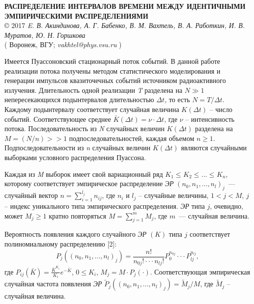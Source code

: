 \begin{center}{ \bf  РАСПРЕДЕЛЕНИЕ ИНТЕРВАЛОВ ВРЕМЕНИ МЕЖДУ ИДЕНТИЧНЫМИ ЭМПИРИЧЕСКИМИ РАСПРЕДЕЛЕНИЯМИ}\\
{\copyright} 2017 {\it  E. В. Акиндинова, А. Г. Бабенко, В. М. Вахтель,
В. А. Работкин,  И. В. Муратов, Ю. Н. Горшкова} \\
( Воронеж, ВГУ; {\it vakhtel@phys.vsu.ru} )
\end{center}

Имеется Пуассоновский стационарный поток событий.
В данной работе реализации потока получены методом статистического моделирования и генерации импульсов квазиточечных событий
источником радиоактивного излучения.
Длительность одной реализации \textit{T} разделена на $N \gg 1$ непересекающихся подынтервалов длительностью $\Delta t$\textit{,} то есть $N=T/\Delta t$. Каждому подынтервалу соответствует случайная величина $K(\Delta t)$ -- число событий.  Соответствующее среднее $\bar{K}(\Delta t)=\nu \cdot \Delta t$, где $\nu $ -- интенсивность потока. Последовательность из \textit{N} случайных величин $K(\Delta t)$ разделена на $M=(N/n)>>1$  подпоследовательностей, каждая объемом $n\ge 1$. Подпоследовательности из \textit{n}  случайных величин $K(\Delta t)$ являются случайными выборками условного распределения Пуассона.


Каждая из \textit{M} выборок имеет свой вариационный ряд $K_{1}  \le _{} K_{2}  \le _{}  ...  \le _{} K{}_{n} $,
которому соответствует эмпирическое распределение {\it ЭР} $ ( n_{0} ,    n_{1} ,  ...  ,   n_{l}  )_{j} $~---
случайный вектор $n=\sum _{i=1}^{l_{j} }n_{ij}  $, где $n_{i} $ и $l_{j} $ --  случайные величины,
$1<j<M$, $j$ -- индекс уникального типа эмпирического распределения.
{\it ЭР}  типа  $j$, очевидно, может $M_{j} \ge 1$ кратно повторяться $M=\sum _{j=1}^{m}M_{j}  $, где $m$~--- случайная величина.


Вероятность появления каждого случайного {\it ЭР} $ (K)$ типа $j$ соответствует полиномиальному распределению [2]:
\[P_{j} (( n_{0} ,  n_{1} ,  ...  ,  n_{l}  )_{j} )=\frac{n!}{n_{0j} !\cdot \cdot \cdot n_{lj} !} P_{0}^{n_{0j} } \cdot \cdot \cdot P_{lj}^{n_{lj} } ,\]
где $P_{ij} (\bar{K})=\frac{\bar{K}^{K_{i} } }{K_{i} } e^{-\bar{K}} $, $0\le K_{i} $, $M_{j} =M\cdot P_{j} (\cdot)$. Соответствующая эмпирическая случайная частота появления {\it ЭР}    $\tilde{P}_{j} (( n_{0} ,  n_{1} ,  ...  ,  n_{l}  )_{j} )=\tilde{M}_{j} /M$, где $\tilde{M}_{j} $ --  случайная величина.


